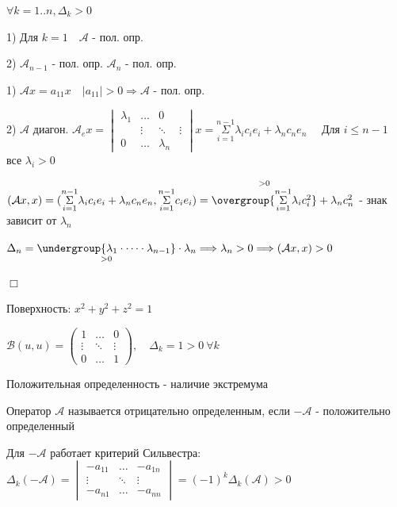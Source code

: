 \documentclass[12pt]{article}
\begin{document}
    $\forall k = 1..n, \Delta_k > 0$

    1) Для $k = 1 \quad \mathcal{A}$ - пол. опр.

    2) $\mathcal{A}_{n-1}$ - пол. опр. \Longrightarrow $\mathcal{A}_n$ - пол. опр.

    1) $\mathcal{A}x = a_{11}x \quad |a_{11}| > 0 \Longrightarrow \mathcal{A}$ - пол. опр.

    2) $\mathcal{A}$ диагон. \quad $\mathcal{A}_e x =
    \begin{vmatrix}\lambda_{1} & \dots & 0 \\ & \vdots & \ddots & \vdots \\ 0 & \dots & \lambda_{n}\end{vmatrix}x =
    \overset{n - 1}{\underset{i = 1}{\Sigma}}\lambda_i c_i e_i + \lambda_n c_n e_n \quad$ Для $i \leq n - 1$ все $\lambda_i > 0$

    $(\mathcal{A}x, x) = (\overset{n - 1}{\underset{i = 1}{\Sigma}} \lambda_i c_i e_i + \lambda_n c_n e_n,
    \overset{n - 1}{\underset{i = 1}{\Sigma}} c_i e_i) = \overset{> 0}{\overgroup{\overset{n - 1}{\underset{i = 1}{\Sigma}} \lambda_i c_i^2}} + \lambda_n c_n^2$ - знак зависит от $\lambda_n$

    $\Delta_n = \underset{> 0}{\undergroup{\lambda_1 \cdot \dots \cdot \lambda_{n-1}}} \cdot \lambda_n
    \Longrightarrow \lambda_n > 0 \Longrightarrow (\mathcal{A}x, x) > 0$

    $\Box$

    \Ex Поверхность: $x^2 + y^2 + z^2 = 1$

    $\mathcal{B}(u, u) = \begin{pmatrix}1 & \dots & 0 \\ \vdots & \ddots & \vdots \\ 0 & \dots & 1\end{pmatrix},
    \quad \Delta_k = 1 > 0 \ \forall k$

    Положительная определенность - наличие экстремума

    \Def Оператор $\mathcal{A}$ называется отрицательно определенным, если $-\mathcal{A}$ - положительно определенный

    \Nota Для $-\mathcal{A}$ работает критерий Сильвестра: $\Delta_k(-\mathcal{A}) =
    \begin{vmatrix}-a_{11} & \dots & -a_{1n} \\ \vdots & \ddots & \vdots \\ -a_{n1} & \dots & -a_{nn}\end{vmatrix} = (-1)^k \Delta_k (\mathcal{A}) > 0$
\end{document}
